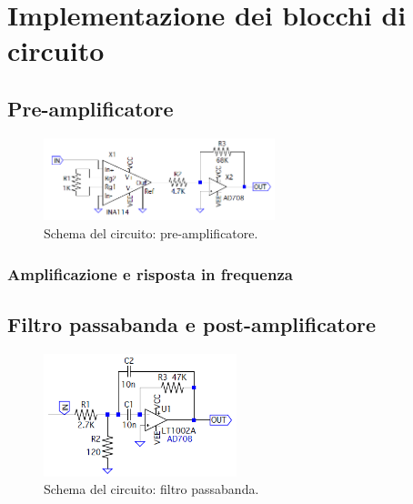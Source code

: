 \documentclass[a4paper,10pt]{article}
\begin{document}
\lipsum[1-2]

\pagebreak

\section{Implementazione dei blocchi di circuito}

\subsection{Pre-amplificatore}

\begin{figure}
	\vspace{-10pt}
	\centering
	\includegraphics[width=0.6\textwidth]{../grafici/PreAmp.png}
	\vspace{-12pt}
	\caption{Schema del circuito: pre-amplificatore.}
	\label{fig:powamp}
	\vspace{-6pt}
\end{figure}

\lipsum[2-3]

\subsubsection*{Amplificazione e risposta in frequenza}

\lipsum[4]

\subsection{Filtro passabanda e post-amplificatore}

\begin{figure}
	\vspace{-10pt}
	\centering
	\includegraphics[width=0.5\textwidth]{../grafici/Bandpass.png}
	\vspace{-12pt}
	\caption{Schema del circuito: filtro passabanda.}
	\label{fig:powamp}
	\vspace{-6pt}
\end{figure}
\end{document}
